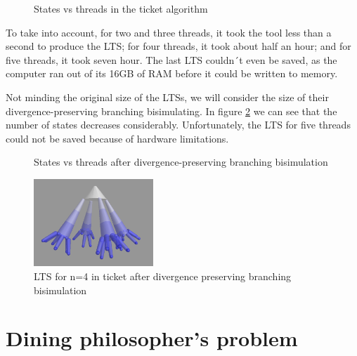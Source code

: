 \documentclass[11pt]{article}
\theoremstyle{definition}
\theoremstyle{plain}
\theoremstyle{definition}
\begin{document}
\begin{appendices}
\begin{figure}
\caption{States vs threads in the ticket algorithm}\label{statesTicket}
\end{figure}

To take into account, for two and three threads, it took the tool less than a second to produce the LTS; for four threads, it took about half an hour; and for five threads, it took seven hour. The last LTS couldn´t even be saved, as the computer ran out of its 16GB of RAM before it could be written to memory.

Not minding the original size of the LTSs, we will consider the size of their divergence-preserving branching bisimulating. In figure \ref{dpbbStates} we can see that the number of states decreases considerably. Unfortunately, the LTS for five threads could not be saved because of hardware limitations.

\begin{figure}
\caption{States vs threads after divergence-preserving branching bisimulation}\label{dpbbStates}
\end{figure}

\begin{figure}
\centering
\includegraphics[width=0.4\textwidth, keepaspectratio]{img/Ticket/n4dpbb.png}
\caption{LTS for n=4 in ticket after divergence preserving branching bisimulation}\label{n4dpbb}
\end{figure}

\section{Dining philosopher's problem}


\end{appendices}
\end{document}

